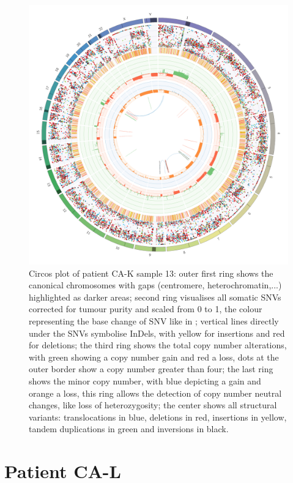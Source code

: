 \begin{figure}[ht]
\centering
\includegraphics[width=.99\linewidth]{Figures/CASCADE/CA82/CA82-13.circos.png}
\caption[Circos plot of patient CA-K sample 13]{Circos plot of patient CA-K sample 13: outer first ring shows the canonical chromosomes with gaps (centromere, heterochromatin,...) highlighted as darker areas; second ring visualises all somatic SNVs corrected for tumour purity and scaled from 0 to 1, the colour representing the base change of SNV like in \protect\textcite{Alexandrov2013}; vertical lines directly under the SNVs symbolise InDels, with yellow for insertions and red for deletions; the third ring shows the total copy number alterations, with green showing a copy number gain and red a loss, dots at the outer border show a copy number greater than four; the last ring shows the minor copy number, with blue depicting a gain and orange a loss, this ring allows the detection of copy number neutral changes, like loss of heterozygosity; the center shows all structural variants: translocations in blue, deletions in red, insertions in yellow, tandem duplications in green and inversions in black.} \label{fig:ca82.13circos}
\end{figure}




\cleardoublepage
\section{Patient CA-L}


